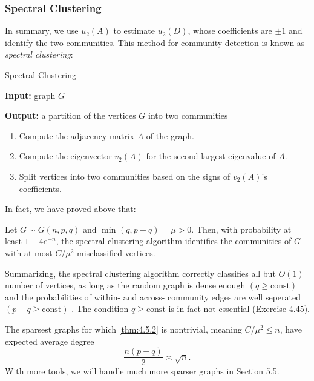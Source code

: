 \subsubsection{Spectral Clustering}
In summary, we use $u_2(A)$ to estimate $u_2(D)$, whose coefficients are $\pm 1$ and identify the two 
communities. This method for community detection is known as \textit{spectral clustering}:

\begin{algorithm}
	\caption{Spectral Clustering}
	\label{alg:sc}
	\begin{algorithmic}
		\item \textbf{Input:} graph $G$
		\item \textbf{Output:} a partition of the vertices $G$ into two communities
		\item \begin{enumerate}[label=\arabic*]
			\item Compute the adjacency matrix $A$ of the graph.
			\item Compute the eigenvector $v_2(A)$ for the second largest eigenvalue of $A$.
			\item Split vertices into two communities based on the signs of $v_2(A)$'s coefficients.
		\end{enumerate}
	\end{algorithmic}
\end{algorithm}

In fact, we have proved above that:
\begin{theorem}
\label{thm:4.5.2}
Let $G \sim G(n, p, q)$ and $\min_{}(q, p - q) = \mu > 0$. Then, with probability at least $1 - 4e^{-n}$, the 
spectral clustering algorithm identifies the communities of $G$ with at most $C / \mu^2$ misclassified 
vertices.
\end{theorem}

Summarizing, the spectral clustering algorithm correctly classifies all but $O(1)$ number of vertices, as long 
as the random graph is dense enough $(q \geq \text{const})$ and the probabilities of within- and across-
community edges are well seperated $(p - q \geq \text{const})$ . The condition $q \geq \text{const}$ is in fact 
not essential (Exercise 4.45).

\begin{remark}[Sparsity]
\label{rmk:4.5.3}
The sparsest graphs for which \cref{thm:4.5.2} is nontrivial, meaning $C / \mu^2 \leq n$, have expected average 
degree 
\[ \frac{n(p + q)}{2} \asymp \sqrt{n}. \]
With more tools, we will handle much more sparser graphs in Section 5.5.
\end{remark}



